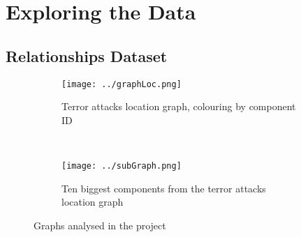 \section{Exploring the Data}
\label{sec:Exploring the Data}

\subsection{Relationships Dataset}


\begin{figure}[H]
\begin{center}
    \begin{subfigure}[b]{0.45\textwidth}
        \texttt{[image: ../graphLoc.png]}
        \caption{Terror attacks location graph, colouring by component ID}
        \label{fig:graphLoc}
    \end{subfigure}
    ~
    \begin{subfigure}[b]{0.45\textwidth}
        \texttt{[image: ../subGraph.png]}
        \caption{Ten biggest components from the terror attacks location graph}
        \label{fig:subGraph}
    \end{subfigure}
\caption{Graphs analysed in the project}
\label{fig:graphPlots}
\end{center}
\end{figure}

